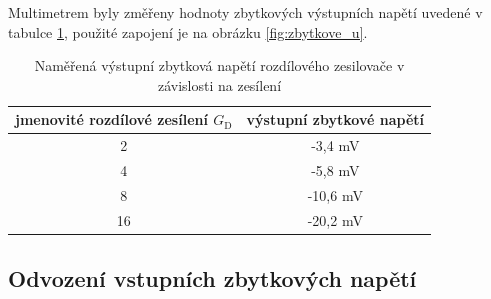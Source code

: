 \documentclass[twoside]{article}
\begin{document}
Multimetrem byly změřeny hodnoty zbytkových výstupních napětí uvedené v tabulce \ref{tab:zbytkova_u},
použité zapojení je na obrázku \ref{fig:zbytkove_u}.

\begin{table}[h!]
    \centering
    \begin{tabular}{c|c}
        jmenovité rozdílové zesílení $G_\text{D}$ & výstupní zbytkové napětí \\
        \hline
        2 & -3,4 \si{\milli\volt} \\
        4 & -5,8 \si{\milli\volt} \\
        8 & -10,6 \si{\milli\volt} \\
        16 & -20,2 \si{\milli\volt}
    \end{tabular}
    \caption{Naměřená výstupní zbytková napětí rozdílového zesilovače v závislosti na zesílení}
    \label{tab:zbytkova_u}
\end{table}

\subsection{Odvození vstupních zbytkových napětí}
\end{document}
